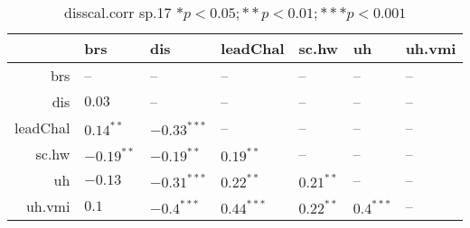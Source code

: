 \begin{table}[ht]
\centering
\begin{tabular}{rllllll}
  \hline
 & brs & dis & leadChal & sc.hw & uh & uh.vmi \\ 
  \hline
brs & -- & -- & -- & -- & -- & -- \\ 
  dis & $0.03$ & -- & -- & -- & -- & -- \\ 
  leadChal & $0.14^{**}$ & $-0.33^{***}$ & -- & -- & -- & -- \\ 
  sc.hw & $-0.19^{**}$ & $-0.19^{**}$ & $0.19^{**}$ & -- & -- & -- \\ 
  uh & $-0.13$ & $-0.31^{***}$ & $0.22^{**}$ & $0.21^{**}$ & -- & -- \\ 
  uh.vmi & $0.1$ & $-0.4^{***}$ & $0.44^{***}$ & $0.22^{**}$ & $0.4^{***}$ & -- \\ 
   \hline
\end{tabular}
\caption{disscal.corr sp.17 $* p < 0.05; ** p < 0.01; *** p < 0.001$} 
\label{freq_corr.disscal.corr.sp.17}
\end{table}
